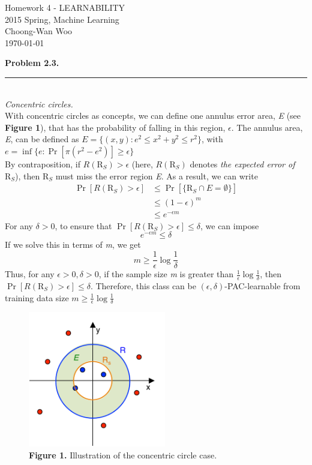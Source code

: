 \documentclass[letterpaper,11pt,notitlepage]{article}
\begin{document}
\begin{center}
	Homework 4 - LEARNABILITY\\
	2015 Spring, Machine Learning\\
	Choong-Wan Woo\\
	\today\\
\end{center}

\hspace*{-1cm}\textbf{Problem 2.3.}  \rule{10.5cm}{0.4pt}\\
\noindent\textit{Concentric circles.}\\

\indent With concentric circles as concepts, we can define one annulus error area, \textit{E} (see \textbf{Figure 1}), that has the probability of falling in this region, $\epsilon$. The annulus area, \textit{E}, can be defined as $E = \{(x,y):e^2\le x^2+y^2 \le r^2\}$, with $e = \inf\{e:\Pr[\pi(r^2-e^2)]\ge \epsilon\}$\\
\indent By contraposition, if $R(\text{R}_S)>\epsilon$ (here, $R(\text{R}_S)$ denotes \textit{the expected error of} $\text{R}_S$), then $\text{R}_S$ must miss the error region \textit{E}. As a result, we can write
\begin{align*}
\Pr [R(\text{R}_S)>\epsilon] &\le \Pr[\{\text{R}_S\cap E =\emptyset\}]\\
&\le(1-\epsilon)^m\\
&\le e^{-\epsilon m}
\end{align*}
\noindent For any $\delta >0$, to ensure that $\Pr[R(\text{R}_S) > \epsilon] \le \delta$, we can impose
\[e^{-\epsilon m} \le \delta\]
If we solve this in terms of \textit{m}, we get
\[m \ge \frac{1}{\epsilon}\log \frac{1}{\delta}\]
\noindent Thus, for any $\epsilon >0, \delta>0$, if the sample size \textit{m} is greater than $\frac{1}{\epsilon}\log \frac{1}{\delta}$, then $\Pr[R(\text{R}_S) > \epsilon] \le \delta$. Therefore, this class can be $(\epsilon,\delta)$-PAC-learnable from training data size $m \ge \frac{1}{\epsilon}\log \frac{1}{\delta}$

\begin{figure}[ht!]
	\centering
	\includegraphics[width=6cm]{Figure1}
	\captionsetup{width=.8\textwidth}
	\caption{\textbf{Figure 1.} Illustration of the concentric circle case.} 
\end{figure} \leavevmode \\
\end{document}
